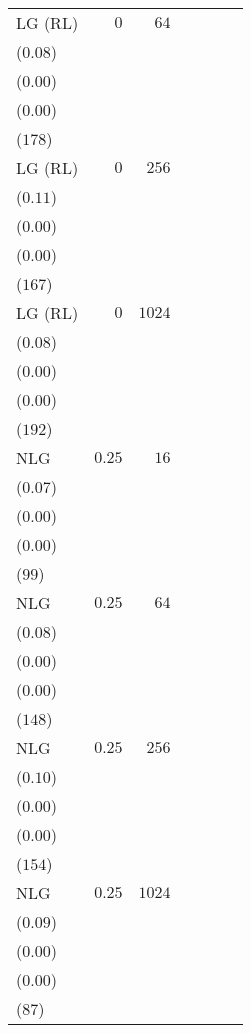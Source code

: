 \begin{table*}[t]
\begin{tabular}{lrrrrrr}
LG {\scriptsize(RL)} & \(0\) & \(64\) & \longcell{\(0.33\)\\{\tiny(\(0.08\))}} & \longcell{\(0.00\)\\{\tiny(\(0.00\))}} & \longcell{\(0.85\)\\{\tiny(\(0.00\))}} & \longcell{\(5930\)\\{\tiny(\(178\))}} \\[2.2ex]
LG {\scriptsize(RL)} & \(0\) & \(256\) & \longcell{\(0.47\)\\{\tiny(\(0.11\))}} & \longcell{\(0.00\)\\{\tiny(\(0.00\))}} & \longcell{\(0.86\)\\{\tiny(\(0.00\))}} & \longcell{\(5710\)\\{\tiny(\(167\))}} \\[2.2ex]
LG {\scriptsize(RL)} & \(0\) & \(1024\) & \longcell{\(0.62\)\\{\tiny(\(0.08\))}} & \longcell{\(0.01\)\\{\tiny(\(0.00\))}} & \longcell{\(0.85\)\\{\tiny(\(0.00\))}} & \longcell{\(5671\)\\{\tiny(\(192\))}} \\[2.2ex]
NLG & \(0.25\) & \(16\) & \longcell{\(0.15\)\\{\tiny(\(0.07\))}} & \longcell{\(0.00\)\\{\tiny(\(0.00\))}} & \longcell{\(0.85\)\\{\tiny(\(0.00\))}} & \longcell{\(6123\)\\{\tiny(\(99\))}} \\[2.2ex]
NLG & \(0.25\) & \(64\) & \longcell{\(0.27\)\\{\tiny(\(0.08\))}} & \longcell{\(0.00\)\\{\tiny(\(0.00\))}} & \longcell{\(0.85\)\\{\tiny(\(0.00\))}} & \longcell{\(5995\)\\{\tiny(\(148\))}} \\[2.2ex]
NLG & \(0.25\) & \(256\) & \longcell{\(0.47\)\\{\tiny(\(0.10\))}} & \longcell{\(0.00\)\\{\tiny(\(0.00\))}} & \longcell{\(0.85\)\\{\tiny(\(0.00\))}} & \longcell{\(5754\)\\{\tiny(\(154\))}} \\[2.2ex]
NLG & \(0.25\) & \(1024\) & \longcell{\(0.61\)\\{\tiny(\(0.09\))}} & \longcell{\(0.01\)\\{\tiny(\(0.00\))}} & \longcell{\(0.85\)\\{\tiny(\(0.00\))}} & \longcell{\(5689\)\\{\tiny(\(87\))}} \\[2.2ex]

\end{tabular}
\end{table*}
